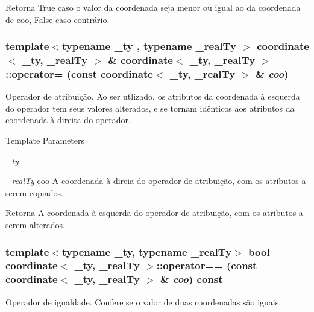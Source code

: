 \begin{DoxyReturn}{Retorna}
True caso o valor da coordenada seja menor ou igual ao da coordenada de coo, False caso contrário. 
\end{DoxyReturn}
\hypertarget{classcoordinate_aeb156220bc0921767319774d77d0eb72}{
\subsubsection[{operator=}]{\setlength{\rightskip}{0pt plus 5cm}template$<$typename \_\-ty , typename \_\-realTy $>$ {\bf coordinate}$<$ \_\-ty, \_\-realTy $>$ \& {\bf coordinate}$<$ \_\-ty, \_\-realTy $>$::operator= (const {\bf coordinate}$<$ \_\-ty, \_\-realTy $>$ \& {\em coo})}}
\label{classcoordinate_aeb156220bc0921767319774d77d0eb72}
Operador de atribuição. Ao ser utlizado, os atributos da coordenada à esquerda do operador tem seus valores alterados, e se tornam idênticos aos atributos da coordenada à direita do operador.


\begin{DoxyTemplParams}{Template Parameters}
\item[{\em \_\-ty}]\item[{\em \_\-realTy}]coo A coordenada à direia do operador de atribuição, com os atributos a serem copiados.\end{DoxyTemplParams}
\begin{DoxyReturn}{Retorna}
A coordenada à esquerda do operador de atribuição, com os atributos a serem alterados. 
\end{DoxyReturn}
\hypertarget{classcoordinate_a063671d1577abcf23a36af1c996ac26a}{
\subsubsection[{operator==}]{\setlength{\rightskip}{0pt plus 5cm}template$<$typename \_\-ty, typename \_\-realTy$>$ bool {\bf coordinate}$<$ \_\-ty, \_\-realTy $>$::operator== (const {\bf coordinate}$<$ \_\-ty, \_\-realTy $>$ \& {\em coo}) const}}
\label{classcoordinate_a063671d1577abcf23a36af1c996ac26a}
Operador de igualdade. Confere se o valor de duas coordenadas são iguais.

